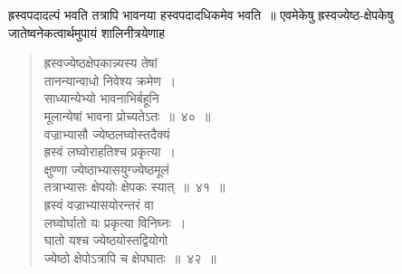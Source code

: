 \documentclass[11pt, openany]{book}
\begin{document}
\noindent ह्रस्वपदादल्पं भवति तत्रापि भावनया हस्वपदादधिकमेव भवति~॥ एवमेकेषु ह्रस्वज्येष्ठ-क्षेपकेषु जातेष्वनेकत्वार्थमुपायं शालिनीत्रयेणाह\textendash
\begin{quote}
    \bs
     ह्रस्वज्येष्ठक्षेपकान्न्यस्य तेषां \\

\vspace{-7mm}
\hspace{1cm} तानन्यान्वाधो निवेश्य क्रमेण~। \\

\vspace{-7mm}
 साध्यान्येभ्यो भावनाभिर्बहूनि \\

\vspace{-7mm}
\hspace{1cm} मूलान्येषां भावना प्रोच्यतेऽतः~॥~४०~॥~\\


 \vspace{-5mm}
 \label{41}
 वज्राभ्यासौ ज्येष्ठलघ्वोस्तदैक्यं \\

\vspace{-7mm}
\hspace{1cm} ह्रस्वं लघ्वोराहतिश्च प्रकृत्या~। \\

\vspace{-7mm}
 क्षुण्णा ज्येष्ठाभ्यासयुग्ज्येष्ठमूलं \\

\vspace{-7mm}
\hspace{1cm} तत्राभ्यासः क्षेपयोः क्षेपकः स्यात्~॥~४१~॥~\\

\vspace{-5mm}
 ह्रस्वं वज्राभ्यासयोरन्तरं वा \\

\vspace{-7mm}
\hspace{1cm} लघ्वोर्घातो यः प्रकृत्या विनिघ्नः~। \\

\vspace{-7mm}
 घातो यश्च ज्येष्ठयोस्तद्वियोगो \\

\vspace{-7mm}
\hspace{1cm} ज्येष्ठो क्षेपोऽत्रापि च क्षेपघातः~॥~४२~॥~
\end{quote}
\end{document}
